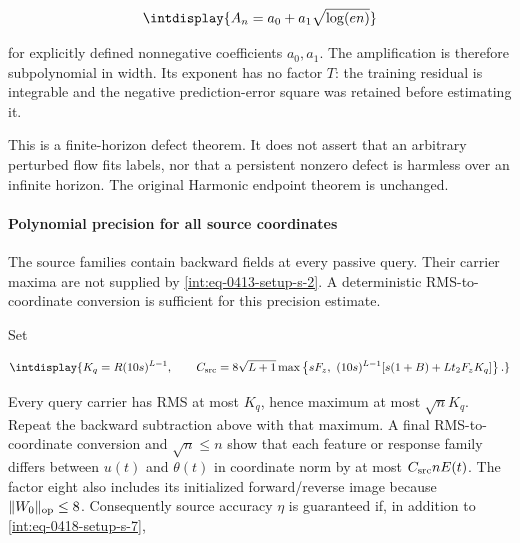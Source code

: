 \begingroup\renewcommand{\theHequation}{intdisplay.865}
\begin{equation*}
\intdisplay{
A_n=a_0+a_1\sqrt{\log(en)}
}
\end{equation*}
\endgroup


for explicitly defined nonnegative coefficients \(a_0,\allowbreak a_1\). The amplification is therefore subpolynomial in width. Its exponent has no factor \(T\): the training residual is integrable and the negative prediction-error square was retained before estimating it.



This is a finite-horizon defect theorem. It does not assert that an arbitrary perturbed flow fits labels, nor that a persistent nonzero defect is harmless over an infinite horizon. The original Harmonic endpoint theorem is unchanged.


\paragraph{Polynomial precision for all source coordinates}
\label{int:setup-stability-4}
\mbox{}\par\smallskip


The source families contain backward fields at every passive query. Their carrier maxima are not supplied by \hyperref[int:eq-setup-s-2]{\eqref{int:eq-0413-setup-s-2}}. A deterministic RMS-to-coordinate conversion is sufficient for this precision estimate.



Set


\begingroup\renewcommand{\theHequation}{intdisplay.866}
\begin{equation*}
\intdisplay{
K_q=R(10s)^{L-1},\qquad
C_{\rm src}=8\sqrt{L+1}\max\left\{
sF_z,\ (10s)^{L-1}[s(1+B)+Lt_2F_zK_q]\right\}.
}
\end{equation*}
\endgroup


Every query carrier has RMS at most \(K_q\), hence maximum at most \(\sqrt nK_q\). Repeat the backward subtraction above with that maximum. A final RMS-to-coordinate conversion and \(\sqrt n\le n\) show that each feature or response family differs between \(u(t)\) and \(\theta(t)\) in coordinate norm by at most \(C_{\rm src}nE(t)\). The factor eight also includes its initialized forward/reverse image because \(\|W_0\|_{\rm op}\le8\). Consequently source accuracy \(\eta\) is guaranteed if, in addition to \hyperref[int:eq-setup-s-7]{\eqref{int:eq-0418-setup-s-7}},


